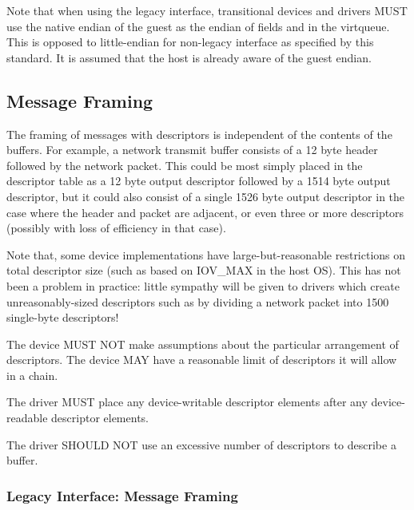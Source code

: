 Note that when using the legacy interface, transitional
devices and drivers MUST use the native
endian of the guest as the endian of fields and in the virtqueue.
This is opposed to little-endian for non-legacy interface as
specified by this standard.
It is assumed that the host is already aware of the guest endian.

\subsection{Message Framing}\label{sec:Basic Facilities of a Virtio Device / Virtqueues / Message Framing}
The framing of messages with descriptors is
independent of the contents of the buffers. For example, a network
transmit buffer consists of a 12 byte header followed by the network
packet. This could be most simply placed in the descriptor table as a
12 byte output descriptor followed by a 1514 byte output descriptor,
but it could also consist of a single 1526 byte output descriptor in
the case where the header and packet are adjacent, or even three or
more descriptors (possibly with loss of efficiency in that case).

Note that, some device implementations have large-but-reasonable
restrictions on total descriptor size (such as based on IOV_MAX in the
host OS). This has not been a problem in practice: little sympathy
will be given to drivers which create unreasonably-sized descriptors
such as by dividing a network packet into 1500 single-byte
descriptors!

The device MUST NOT make assumptions about the particular arrangement
of descriptors.  The device MAY have a reasonable limit of descriptors
it will allow in a chain.

The driver MUST place any device-writable descriptor elements after
any device-readable descriptor elements.

The driver SHOULD NOT use an excessive number of descriptors to
describe a buffer.

\subsubsection{Legacy Interface: Message Framing}\label{sec:Basic Facilities of a Virtio Device / Virtqueues / Message Framing / Legacy Interface: Message Framing}

